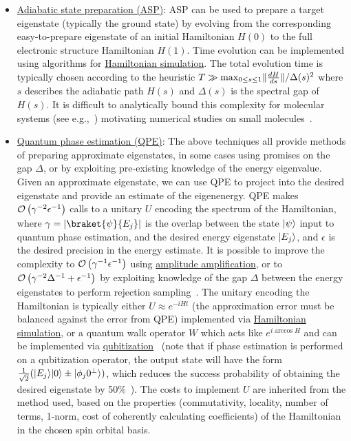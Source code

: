 \begin{refsection}
\begin{itemize}
\begin{itemize}
        \item \hyperref[prim:QuantumAdiabaticAlgorithm]{Adiabatic state preparation (ASP)}: ASP can be used to prepare a target eigenstate (typically the ground state) by evolving from the corresponding easy-to-prepare eigenstate of an initial Hamiltonian $H(0)$ to the full electronic structure Hamiltonian $H(1)$. Time evolution can be implemented using algorithms for \hyperref[prim:HamiltonianSimulation]{Hamiltonian simulation}. The total evolution time is typically chosen according to the heuristic $T \gg \max_{0 \leq s \leq 1} \lVert\frac{dH}{ds}\rVert / \Delta(s)^2 $ where $s$ describes the adiabatic path $H(s)$ and $\Delta(s)$ is the spectral gap of $H(s)$. It is difficult to analytically bound this complexity for molecular systems (see e.g.,~\cite{reiher2017ElucidatingReactionMechanisms}) motivating numerical studies on small molecules~\cite{veis2014AdiabaticStatePrepMethylene,kremenetski2021AdiabaticMolecular, lee2022isThereEvidenceChemistry,Sugisaki2022AdiabaticMolecular}.\item \hyperref[prim:QPE]{Quantum phase estimation (QPE)}: The above techniques all provide methods of preparing approximate eigenstates, in some cases using promises on the gap $\Delta$, or by exploiting pre-existing knowledge of the energy eigenvalue. Given an approximate eigenstate, we can use QPE to project into the desired eigenstate and provide an estimate of the eigenenergy. QPE makes $\mathcal{O}\left( \gamma^{-2} \epsilon^{-1} \right)$ calls to a unitary $U$ encoding the spectrum of the Hamiltonian, where $\gamma = |\braket{\psi}{E_j}|$ is the overlap between the state $\lvert\psi\rangle$ input to quantum phase estimation, and the desired energy eigenstate $\lvert E_j\rangle$, and $\epsilon$ is the desired precision in the energy estimate. It is possible to improve the complexity to $\mathcal{O}\left( \gamma^{-1} \epsilon^{-1} \right)$ using \hyperref[prim:AA]{amplitude amplification}, or to $\mathcal{O}\left( \gamma^{-2} \Delta^{-1} + \epsilon^{-1} \right)$ by exploiting knowledge of the gap $\Delta$ between the energy eigenstates to perform rejection sampling~\cite{berry2018ImprovedEigenstatesFermionic}.
        The unitary encoding the Hamiltonian is typically either $U \approx e^{-iHt}$ (the approximation error must be balanced against the error from QPE) implemented via \hyperref[prim:HamiltonianSimulation]{Hamiltonian simulation}, or a quantum walk operator $W$ which acts like $e^{i\arccos{H}}$ and can be implemented via \hyperref[prim:Qubitization]{qubitization}~\cite{poulin2018SpectralQubitization,berry2018ImprovedEigenstatesFermionic} (note that if phase estimation is performed on a qubitization operator, the output state will have the form $\frac{1}{\sqrt{2}}(\lvert E_j\rangle\lvert0\rangle \pm \lvert\phi_j 0^\perp\rangle)$, which reduces the success probability of obtaining the desired eigenstate by 50\%~\cite{berry2018ImprovedEigenstatesFermionic}). The costs to implement $U$ are inherited from the method used, based on the properties (commutativity, locality, number of terms, 1-norm, cost of coherently calculating coefficients) of the Hamiltonian in the chosen spin orbital basis.   
    \end{itemize}


\end{itemize}
\end{refsection}
